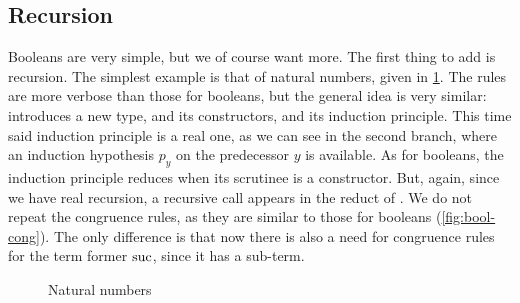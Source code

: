 \subsection{Recursion}

Booleans are very simple, but we of course want more. The first thing to add is recursion.
The simplest example is that of natural numbers, given in \cref{fig:nat}.
The rules are more verbose than those for booleans, but the general idea is very similar:
 introduces a new type, 
and  its constructors, and  its induction
principle. This time said induction principle is a real one, as we can see in
the second branch, where an induction hypothesis $p_{y}$ on the predecessor $y$ is available.
As for booleans, the induction principle reduces when its scrutinee is a constructor.
But, again, since we have real recursion,
a recursive call appears in the reduct of .
We do not repeat the congruence rules, as they are similar to those for booleans
(\cref{fig:bool-cong}). The only difference is that now there is also a need for congruence
rules for the term former $\operatorname{suc}$, since it has a sub-term.

\begin{figure}[h]
  \caption{Natural numbers}
  \label{fig:nat}
\end{figure}

